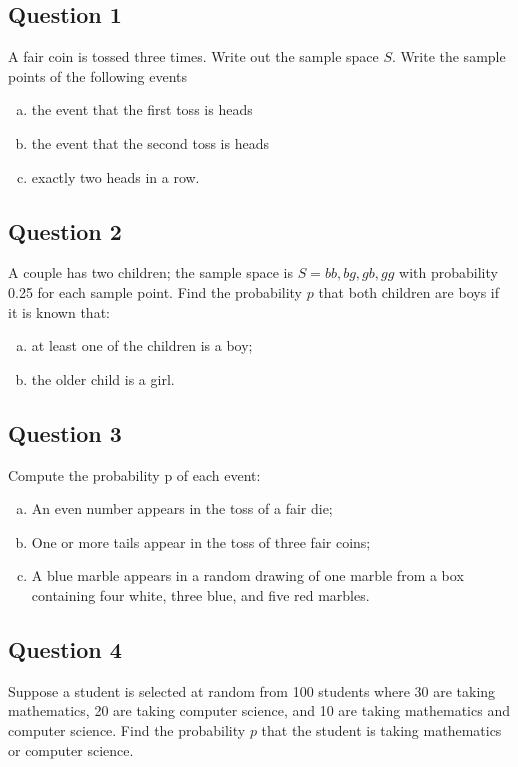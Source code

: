 \documentclass[a4paper,12pt]{article}
\begin{document}
\subsection*{Question 1}
A fair coin is tossed three times. Write out the sample space $S$. Write the sample points of the following events
\begin{enumerate}[(a)]
    \item  the event that the first toss is heads
\item the event that the second toss is heads
\item exactly two heads in a row.
\end{enumerate}


\subsection*{Question 2}
A couple has two children; the sample space is $S = {bb, bg, gb, gg}$ with probability 0.25 for each sample point. Find the probability $p$ that both children are boys if it is known that: 

\begin{enumerate}[(a)]
    \item at least one of the children is a boy;
\item the older child is a girl. 		%
\end{enumerate}

\subsection*{Question 3}
Compute the probability p of each event:

\begin{enumerate}[(a)]
    \item An even number appears in the toss of a fair die;
\item One or more tails appear in the toss of three fair coins;
\item A blue marble appears in a random drawing of one marble from a box containing four white, three blue, and five red marbles.
\end{enumerate}

\subsection*{Question 4}
Suppose a student is selected at random from 100 students where 30 are taking mathematics, 20 are taking computer science, and 10 are taking mathematics and computer science. Find the probability $p$ that the student is taking mathematics or computer science.
\end{document}
